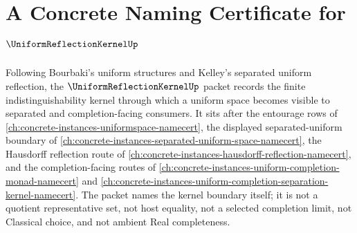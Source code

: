 \chapter{A Concrete Naming Certificate for $\UniformReflectionKernelUp$}
\label{ch:concrete-instances-uniform-reflection-kernel-namecert}

Following Bourbaki's uniform structures and Kelley's separated uniform reflection, the $\UniformReflectionKernelUp$ packet records the finite indistinguishability kernel through which a uniform space becomes visible to separated and completion-facing consumers. It sits after the entourage rows of \autoref{ch:concrete-instances-uniformspace-namecert}, the displayed separated-uniform boundary of \autoref{ch:concrete-instances-separated-uniform-space-namecert}, the Hausdorff reflection route of \autoref{ch:concrete-instances-hausdorff-reflection-namecert}, and the completion-facing routes of \autoref{ch:concrete-instances-uniform-completion-monad-namecert} and \autoref{ch:concrete-instances-uniform-completion-separation-kernel-namecert}. The packet names the kernel boundary itself; it is not a quotient representative set, not host equality, not a selected completion limit, not Classical choice, and not ambient Real completeness.

